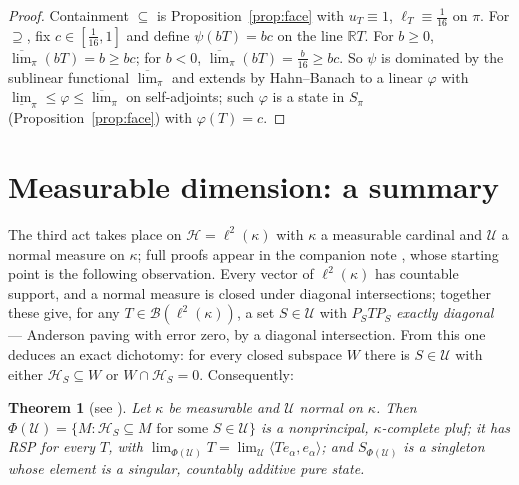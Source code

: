 \documentclass[11pt,reqno]{amsart}
\newtheorem{theorem}{Theorem}[section]
\theoremstyle{definition}
\newcommand{\HH}{\mathcal{H}}
\newcommand{\R}{\mathbb{R}}
\newcommand{\pluf}{\pi}
\begin{document}
\begin{proof}
Containment $\subseteq$ is Proposition~\ref{prop:face} with $u_T\equiv1$,
$\ell_T\equiv\tfrac1{16}$ on $\pluf$. For $\supseteq$, fix $c\in[\tfrac1{16},1]$ and
define $\psi(bT)=bc$ on the line $\R T$. For $b\ge0$,
$\overline{\lim}_\pluf(bT)=b\ge bc$; for $b<0$,
$\overline{\lim}_\pluf(bT)=\tfrac b{16}\ge bc$. So $\psi$ is dominated by the
sublinear functional $\overline{\lim}_\pluf$ and extends by Hahn--Banach to a linear
$\varphi$ with $\underline{\lim}_\pluf\le\varphi\le\overline{\lim}_\pluf$ on
self-adjoints; such $\varphi$ is a state in $S_\pluf$ (Proposition~\ref{prop:face}) with
$\varphi(T)=c$.
\end{proof}

\section{Measurable dimension: a summary}\label{sec:meas}

The third act takes place on $\HH=\ell^2(\kappa)$ with $\kappa$ a measurable cardinal and
$\mathcal U$ a normal measure on $\kappa$; full proofs appear in the companion note
\cite{FWIII}, whose starting point is the following observation. Every vector of
$\ell^2(\kappa)$ has countable support, and a normal measure is closed under diagonal
intersections; together these give, for any $T\in\mathcal B(\ell^2(\kappa))$, a set
$S\in\mathcal U$ with $P_STP_S$ \emph{exactly diagonal} --- Anderson paving with error
zero, by a diagonal intersection. From this one deduces an exact dichotomy: for every
closed subspace $W$ there is $S\in\mathcal U$ with either $\HH_S\subseteq W$ or
$W\cap\HH_S=0$. Consequently:

\begin{theorem}[{see \cite{FWIII}}]\label{thm:meas}
Let $\kappa$ be measurable and $\mathcal U$ normal on $\kappa$. Then
$\Phi(\mathcal U)=\{M:\HH_S\subseteq M\text{ for some }S\in\mathcal U\}$ is a
nonprincipal, $\kappa$-complete pluf; it has RSP for every $T$, with
$\lim_{\Phi(\mathcal U)}T=\lim_{\mathcal U}\langle Te_\alpha,e_\alpha\rangle$; and
$S_{\Phi(\mathcal U)}$ is a singleton whose element is a singular, countably additive
pure state.
\end{theorem}
\end{document}
